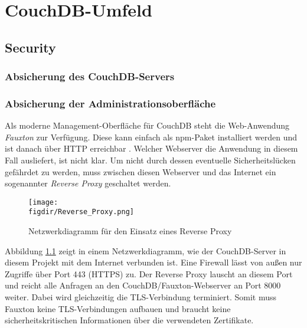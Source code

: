\chapter{CouchDB-Umfeld}
\label{Umfeld}

\section{Security}

\subsection{Absicherung des CouchDB-Servers}

\subsection{Absicherung der Administrationsoberfläche}

Als moderne Management-Oberfläche für CouchDB steht die Web-Anwendung \emph{Fauxton} zur Verfügung. Diese kann einfach als npm-Paket installiert werden und ist danach über HTTP erreichbar \cite{fauxton:overview}. Welcher Webserver die Anwendung in diesem Fall ausliefert, ist nicht klar. Um nicht durch dessen eventuelle Sicherheitslücken gefährdet zu werden, muss zwischen diesen Webserver und das Internet ein sogenannter \emph{Reverse Proxy} geschaltet werden.

\begin{figure}[htb]
	\centering
	\caption{Netzwerkdiagramm für den Einsatz eines Reverse Proxy}
	\label{fig:reverseproxy}
	\texttt{[image: \\figdir/Reverse\_Proxy.png]}
\end{figure}

Abbildung \ref{fig:reverseproxy} zeigt in einem Netzwerkdiagramm, wie der CouchDB-Server in diesem Projekt mit dem Internet verbunden ist. Eine Firewall lässt von außen nur Zugriffe über Port 443 (HTTPS) zu. Der Reverse Proxy lauscht an diesem Port und reicht alle Anfragen an den CouchDB/Fauxton-Webserver an Port 8000 weiter. Dabei wird gleichzeitig die TLS-Verbindung terminiert. Somit muss Fauxton keine TLS-Verbindungen aufbauen und braucht keine sicherheitskritischen Informationen über die verwendeten Zertifikate.

